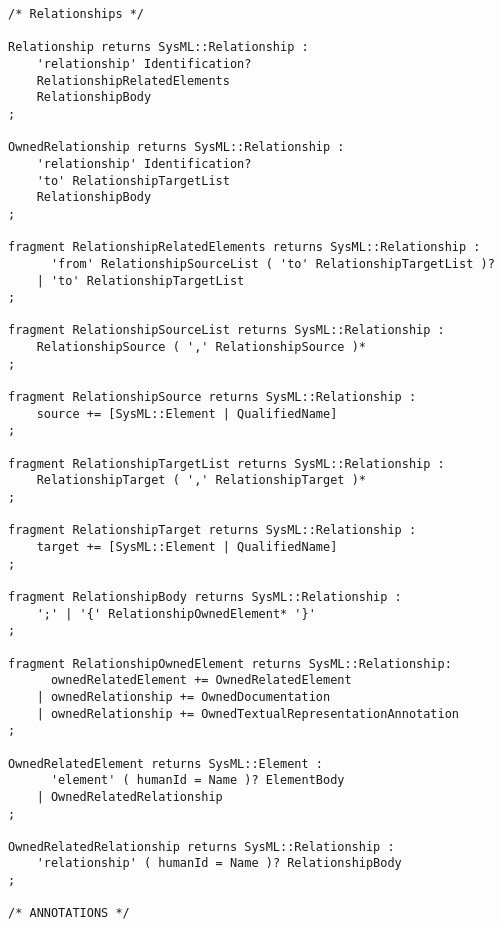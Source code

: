
\begin{lstlisting}[caption={Confidence and evidences for trustable traceability},label=lst:quality,style=mystylexcore]
/* Relationships */

Relationship returns SysML::Relationship :
    'relationship' Identification?
    RelationshipRelatedElements
    RelationshipBody
;

OwnedRelationship returns SysML::Relationship :
    'relationship' Identification?
    'to' RelationshipTargetList
    RelationshipBody
;

fragment RelationshipRelatedElements returns SysML::Relationship :
      'from' RelationshipSourceList ( 'to' RelationshipTargetList )?
    | 'to' RelationshipTargetList
;

fragment RelationshipSourceList returns SysML::Relationship :
    RelationshipSource ( ',' RelationshipSource )*
;

fragment RelationshipSource returns SysML::Relationship :
    source += [SysML::Element | QualifiedName]
;

fragment RelationshipTargetList returns SysML::Relationship :
    RelationshipTarget ( ',' RelationshipTarget )*
;

fragment RelationshipTarget returns SysML::Relationship :
    target += [SysML::Element | QualifiedName]
;

fragment RelationshipBody returns SysML::Relationship :
    ';' | '{' RelationshipOwnedElement* '}'
;

fragment RelationshipOwnedElement returns SysML::Relationship:
      ownedRelatedElement += OwnedRelatedElement
    | ownedRelationship += OwnedDocumentation
    | ownedRelationship += OwnedTextualRepresentationAnnotation
;

OwnedRelatedElement returns SysML::Element :
      'element' ( humanId = Name )? ElementBody
    | OwnedRelatedRelationship
;

OwnedRelatedRelationship returns SysML::Relationship :
	'relationship' ( humanId = Name )? RelationshipBody
;

/* ANNOTATIONS */
\end{lstlisting}




